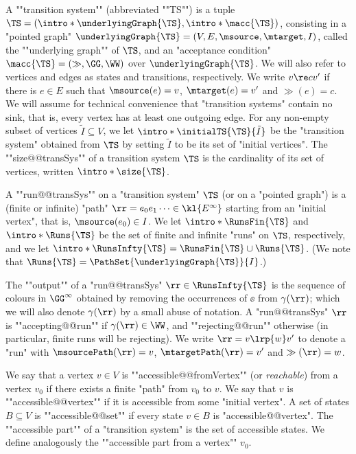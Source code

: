 \documentclass{theoretics}
\begin{document}
\AP A ""transition system"" (abbreviated ""TS"") is a tuple $\TS = (\intro*\underlyingGraph{\TS}, \intro*\macc{\TS})$, consisting in a "pointed graph" $\underlyingGraph{\TS} = (V,E, \msource, \mtarget, I)$, called the ""underlying graph"" of $\TS$, and an "acceptance condition" $\macc{\TS} = (\gg, \GG, \WW)$  over $\underlyingGraph{\TS}$. We will also refer to vertices and edges as states and transitions, respectively. We write $v \re c v'$ if there is $e\in E$ such that $\msource(e)=v$, $\mtarget(e)=v'$ and $\gg(e)=c$.
We will assume for technical convenience that "transition systems" contain no sink, that is, every vertex has at least one outgoing edge.
\AP For any non-empty subset of vertices $\tilde{I} \subseteq V$, we let $\intro*\initialTS{\TS}{\tilde{I}}$ be the "transition system" obtained from $\TS$ by setting $\tilde{I}$ to be its set of "initial vertices".
\AP The ""size@@transSys"" of a transition system $\TS$ is the cardinality of its set of vertices, written $\intro*\size{\TS}$.


\AP A ""run@@transSys"" on a "transition system" $\TS$ (or on a "pointed graph") is a (finite or infinite) 
"path" $\rr=e_0e_1\dots \in \kl{E^\infty}$ starting from an "initial vertex", that is, $\msource(e_0)\in I$.
We let $\intro*\RunsFin{\TS}$ and $\intro*\Runs{\TS}$ be the set of finite and infinite "runs" on $\TS$, respectively, and we let $\intro*\RunsInfty{\TS} = \RunsFin{\TS}\cup \Runs{\TS}$. (We note that $\Runs{\TS} = \PathSet{\underlyingGraph{\TS}}{I}$.)


\AP The ""output"" of a "run@@transSys" $\rr \in \RunsInfty{\TS}$ is the sequence of colours in $\GG^\infty$ obtained by removing the occurrences of $\ee$ from $\gamma(\rr)$; which we will also denote $\gamma(\rr)$ by a small abuse of notation. %
\AP A "run@@transSys" $\rr$ is ""accepting@@run"" if $\gamma(\rr)\in \WW$, and ""rejecting@@run"" otherwise (in particular, finite runs will be rejecting).
We write $\rr = v\lrp{w} v'$ to denote a "run" with $\msourcePath(\rr)=v$, $\mtargetPath(\rr)=v'$ and $\gg(\rr)=w$.


\AP We say that a vertex $v\in V$ is ""accessible@@fromVertex"" (or \emph{reachable}) from a vertex $v_0$ if there exists a finite "path" from $v_0$ to $v$. We say that $v$ is ""accessible@@vertex"" if it is accessible from some "initial vertex". A set of states $B\subseteq V$ is ""accessible@@set"" if every state $v\in B$ is "accessible@@vertex". 
\AP The ""accessible part"" of a "transition system" is the set of accessible states. We define analogously the ""accessible part from a vertex"" $v_0$.
\end{document}
